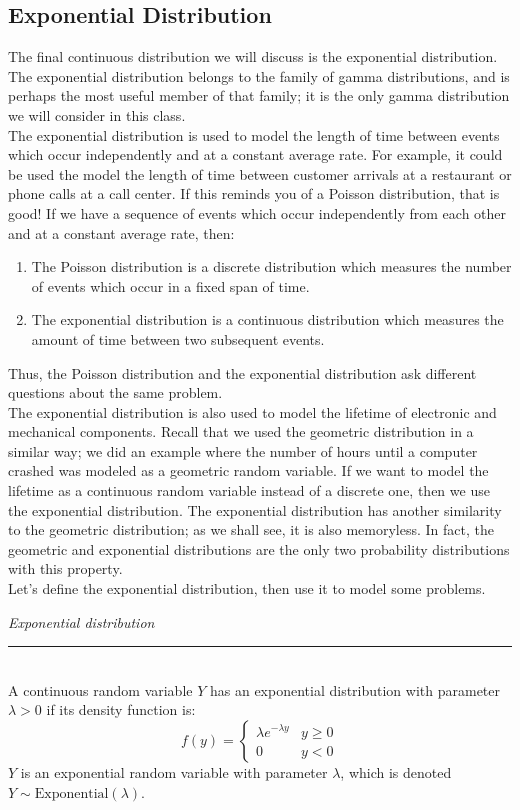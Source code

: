 \documentclass[notes.tex]{subfiles}
\begin{document}
\subsection{Exponential Distribution}
The final continuous distribution we will discuss is the exponential distribution. The exponential distribution belongs to the family of gamma distributions, and is perhaps the most useful member of that family; it is the only gamma distribution we will consider in this class.\\

The exponential distribution is used to model the length of time between events which occur independently and at a constant average rate. For example, it could be used the model the length of time between customer arrivals at a restaurant or phone calls at a call center. If this reminds you of a Poisson distribution, that is good! If we have a sequence of events which occur independently from each other and at a constant average rate, then:
\begin{enumerate}
\item The Poisson distribution is a discrete distribution which measures the number of events which occur in a fixed span of time.
\item The exponential distribution is a continuous distribution which measures the amount of time between two subsequent events.
\end{enumerate}
Thus, the Poisson distribution and the exponential distribution ask different questions about the same problem.\\

The exponential distribution is also used to model the lifetime of electronic and mechanical components. Recall that we used the geometric distribution in a similar way; we did an example where the number of hours until a computer crashed was modeled as a geometric random variable. If we want to model the lifetime as a continuous random variable instead of a discrete one, then we use the exponential distribution. The exponential distribution has another similarity to the geometric distribution; as we shall see, it is also memoryless. In fact, the geometric and exponential distributions are the only two probability distributions with this property.\\

Let's define the exponential distribution, then use it to model some problems.

\begin{framed}
\emph{Exponential distribution}\\
  \rule{\dimexpr{}\fboxrule}{.1pt} \\
A continuous random variable $Y$ has an exponential distribution with parameter $\lambda > 0$ if its density function is:
\[
f(y) = \begin{cases}
\lambda e^{-\lambda y} & y \geq 0 \\
0 & y < 0
\end{cases}
\]
$Y$ is an exponential random variable with parameter $\lambda$, which is denoted $Y \sim \text{Exponential}(\lambda)$.
\end{framed}
\end{document}
